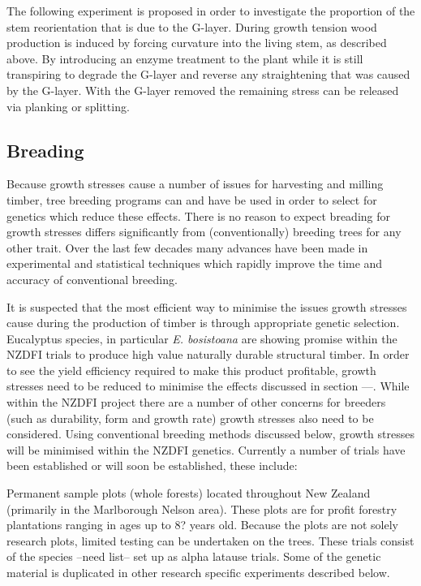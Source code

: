 \documentclass{article}
\begin{document}
The following experiment is proposed in order to investigate the proportion of
the stem reorientation that is due to the G-layer. During growth tension wood
production is induced by forcing curvature into the living stem, as described
above. By introducing an enzyme treatment to the plant while it is still
transpiring to degrade the G-layer and reverse any straightening that was caused
by the G-layer. With the G-layer removed the remaining stress can be released
via planking or splitting.

\subsection{Breading}
Because growth stresses cause a number of issues for harvesting and milling
timber, tree breeding programs can and have be used in order to select for
genetics which reduce these effects. There is no reason to expect  breading for
growth stresses differs significantly from (conventionally) breeding trees for
any other trait. Over the last few decades many advances have been made in
experimental and statistical techniques which rapidly improve the time and
accuracy of conventional breeding.

It is suspected that the most efficient way to minimise the issues growth
stresses cause during the production of timber is through appropriate genetic
selection. Eucalyptus species, in particular \textit{E. bosistoana} are showing promise
within the NZDFI trials to produce high value naturally durable structural
timber. In order to see the yield efficiency required to make this product
profitable, growth stresses need to be reduced to minimise the effects discussed
in section ---. While within the NZDFI project there are a number of other
concerns for breeders (such as durability, form and growth rate) growth stresses
also need to be considered. Using conventional breeding methods discussed below,
growth stresses will be minimised within the NZDFI genetics. Currently a number
of trials have been established or will soon be established, these include:

Permanent sample plots (whole forests) located throughout New Zealand (primarily
in the Marlborough Nelson area). These plots are for profit forestry plantations
ranging in ages up to 8? years old. Because the plots are not solely research
plots, limited testing can  be undertaken on the trees. These trials consist of
the species --need list-- set up as alpha latause trials. Some of the genetic
material is duplicated in other research specific experiments described below.
\end{document}
